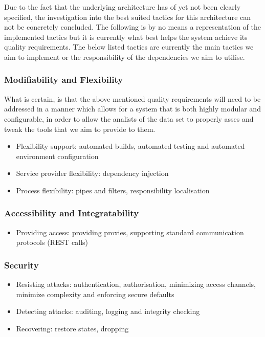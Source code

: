 \documentclass{article}
\begin{document}
	Due to the fact that the underlying architecture has of yet not been clearly specified, the investigation into the best suited tactics for this architecture can not be concretely concluded. The following is by no means a representation of the implemented tactics but it is currently what best helps the system achieve its quality requirements. The below listed tactics are currently the main tactics we aim to implement or the responsibility of the dependencies we aim to utilise.
	
		\subsubsection{Modifiability and Flexibility}

		What is certain, is that the above mentioned quality requirements will need to be addressed in a manner which allows for a system that is both highly modular and configurable, in order to allow the analists of the data set to properly asses and tweak the tools that we aim to provide to them. 

		\begin{itemize}

			\item Flexibility support: automated builds, automated testing and automated environment configuration
			\item Service provider flexibility: dependency injection
			\item Process flexibility: pipes and filters, responsibility localisation

		\end{itemize}

		\subsubsection{Accessibility and Integratability}

		\begin{itemize}

			\item Providing access: providing proxies, supporting standard communication protocols (REST calls)

		\end{itemize}

		\subsubsection{Security}

		\begin{itemize}

			\item Resisting attacks: authentication, authorisation, minimizing access channels, minimize complexity and enforcing secure defaults
			\item Detecting attacks: auditing, logging and integrity checking
			\item Recovering: restore states, dropping

		\end{itemize}
\end{document}

